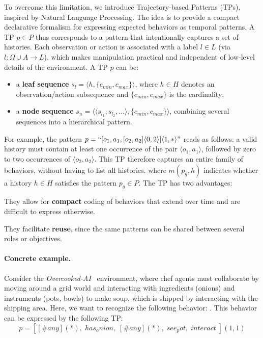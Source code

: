 To overcome this limitation, we introduce Trajectory-based Patterns (TPs), inspired by Natural Language Processing. The idea is to provide a compact declarative formalism for expressing expected behaviors as temporal patterns. A TP \(p \in P\) thus corresponds to a pattern that intentionally captures a set of histories. Each observation or action is associated with a label \(l \in L\) (via \(l: \Omega \cup A \to L\)), which makes manipulation practical and independent of low-level details of the environment.
%
A TP \(p\) can be:
\begin{itemize}
  \item a \textbf{leaf sequence} \(s_l = \langle h, \{c_{min}, c_{max}\} \rangle\), where \(h \in H\) denotes an observation/action subsequence and \(\{c_{min}, c_{max}\}\) is the cardinality;
  \item a \textbf {node sequence} \(s_n = \langle \langle s_{l_1}, s_{l_2}, \dots \rangle, \{c_{min}, c_{max}\} \rangle\), combining several sequences into a hierarchical pattern.
\end{itemize}

\noindent
For example, the pattern
%
$p = ``[o_1,a_1,[o_2,a_2]\langle0,2\rangle]\langle1,*\rangle"$
%
reads as follows: a valid history must contain at least one occurrence of the pair \(\langle o_1,a_1\rangle\), followed by zero to two occurrences of \(\langle o_2,a_2\rangle\). This TP therefore captures an entire family of behaviors, without having to list all histories.
%
where \(m(p_g,h)\) indicates whether a history \(h \in H\) satisfies the pattern \(p_g \in P\).
%
The TP has two advantages:
\begin{enumerate*}[label={\roman*) },itemjoin={; \quad}]
  \item They allow for \textbf{compact} coding of behaviors that extend over time and are difficult to express otherwise.
  \item They facilitate \textbf{reuse}, since the same patterns can be shared between several roles or objectives.
\end{enumerate*}

\paragraph{Concrete example.} Consider the \textit{Overcooked-AI}~\cite{overcookedai} environment, where chef agents must collaborate by moving around a grid world and interacting with ingredients (onions) and instruments (pots, bowls) to make soup, which is shipped by interacting with the shipping area. Here, we want to recognize the following behavior: . This behavior can be expressed by the following TP:
\[
  p = [[\#any](*) , \; has_onion , \; [\#any](*) , \; see_pot , \; interact \;](1,1)
\]

